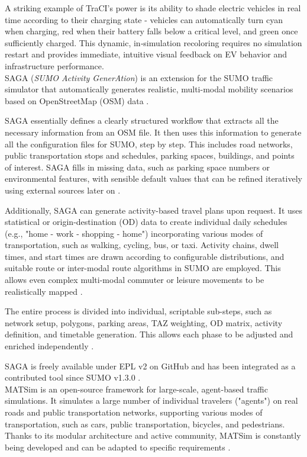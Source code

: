 A striking example of TraCI’s power is its ability to shade electric vehicles in real time according to their charging state - vehicles can automatically turn cyan when charging, red when their battery falls below a critical level, and green once sufficiently charged. This dynamic, in‑simulation recoloring requires no simulation restart and provides immediate, intuitive visual feedback on EV behavior and infrastructure performance.\\

SAGA (\textit{SUMO Activity GenerAtion}) is an extension for the SUMO traffic simulator that automatically generates realistic, multi-modal mobility scenarios based on OpenStreetMap (OSM) data \cite{codeca_saga_2022}.

SAGA essentially defines a clearly structured workflow that extracts all the necessary information from an OSM file. It then uses this information to generate all the configuration files for SUMO, step by step. This includes road networks, public transportation stops and schedules, parking spaces, buildings, and points of interest. SAGA fills in missing data, such as parking space numbers or environmental features, with sensible default values that can be refined iteratively using external sources later on \cite{codeca_saga_2022}.

Additionally, SAGA can generate activity-based travel plans upon request. It uses statistical or origin-destination (OD) data to create individual daily schedules (e.g., "home - work - shopping - home") incorporating various modes of transportation, such as walking, cycling, bus, or taxi. Activity chains, dwell times, and start times are drawn according to configurable distributions, and suitable route or inter-modal route algorithms in SUMO are employed. This allows even complex multi-modal commuter or leisure movements to be realistically mapped \cite{codeca_saga_2022}.

The entire process is divided into individual, scriptable sub-steps, such as network setup, polygons, parking areas, TAZ weighting, OD matrix, activity definition, and timetable generation. This allows each phase to be adjusted and enriched independently \cite{codeca_saga_2022}.

SAGA is freely available under EPL v2 on GitHub and has been integrated as a contributed tool since SUMO v1.3.0 \cite{codeca_saga_2022}.\\

MATSim is an open-source framework for large-scale, agent-based traffic simulations. It simulates a large number of individual travelers ("agents") on real roads and public transportation networks, supporting various modes of transportation, such as cars, public transportation, bicycles, and pedestrians. Thanks to its modular architecture and active community, MATSim is constantly being developed and can be adapted to specific requirements \cite{community_matsim_2025}.

